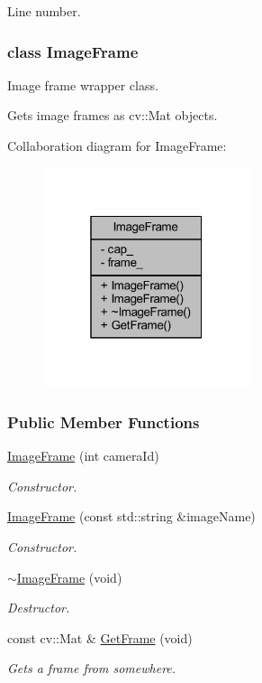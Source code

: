 Line number. 

\label{class_image_frame}
\hypertarget{group___core_class_image_frame}{}
\subsubsection{class Image\-Frame}
Image frame wrapper class. 

Gets image frames as cv\-::\-Mat objects. 

Collaboration diagram for Image\-Frame\-:
\nopagebreak
\begin{figure}[H]
\begin{center}
\leavevmode
\includegraphics[width=172pt]{class_image_frame__coll__graph}
\end{center}
\end{figure}
\subsubsection*{Public Member Functions}
\begin{DoxyCompactItemize}
\item 
\hyperlink{group___core_a117419148b5bcc26cc145d3f2f186bad}{Image\-Frame} (int camera\-Id)
\begin{DoxyCompactList}\small\item\em Constructor. \end{DoxyCompactList}\item 
\hyperlink{group___core_a59c1d9b9e30400514172b549b5f087d9}{Image\-Frame} (const std\-::string \&image\-Name)
\begin{DoxyCompactList}\small\item\em Constructor. \end{DoxyCompactList}\item 
\hyperlink{group___core_a2f365f54366e61d0fffe41a2e24ba570}{$\sim$\-Image\-Frame} (void)
\begin{DoxyCompactList}\small\item\em Destructor. \end{DoxyCompactList}\item 
const cv\-::\-Mat \& \hyperlink{group___core_a886d65831c708b65ba5596aab1aca438}{Get\-Frame} (void)
\begin{DoxyCompactList}\small\item\em Gets a frame from somewhere. \end{DoxyCompactList}\end{DoxyCompactItemize}

